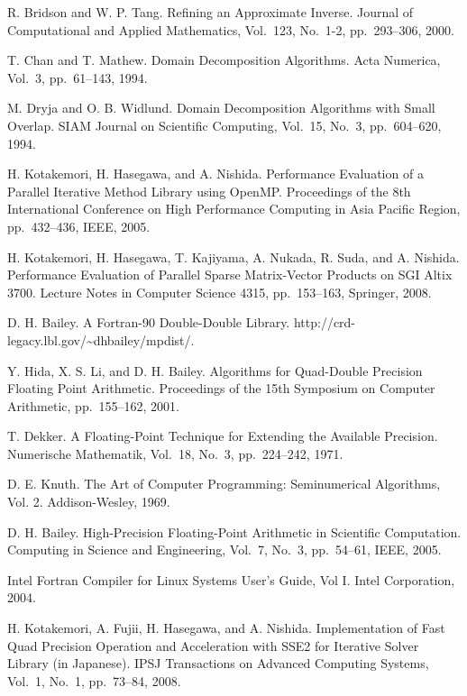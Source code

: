\documentclass[a4paper]{article}
\begin{document}
\begin{thebibliography}{10}
R. Bridson and W. P. Tang.
\newblock Refining an Approximate Inverse.
\newblock Journal of Computational and Applied Mathematics, Vol.~123, No.~1-2, pp.\ 293--306, 2000. 

T. Chan and T. Mathew.
\newblock Domain Decomposition Algorithms.
\newblock Acta Numerica, Vol.~3, pp.\ 61--143, 1994. 

M. Dryja and O. B. Widlund.
\newblock Domain Decomposition Algorithms with Small Overlap.
\newblock SIAM Journal on Scientific Computing, Vol.~15, No.~3, pp.\ 604--620, 1994.

H. Kotakemori, H. Hasegawa, and A. Nishida.
\newblock Performance Evaluation of a Parallel Iterative Method Library using OpenMP.
\newblock Proceedings of the 8th International Conference on High
	Performance Computing in Asia Pacific Region, pp.\ 432--436, IEEE, 2005.

H. Kotakemori, H. Hasegawa, T. Kajiyama, A. Nukada, R. Suda, and A. Nishida.
\newblock Performance Evaluation of Parallel Sparse Matrix-Vector Products on SGI Altix 3700.
\newblock Lecture Notes in Computer Science 4315, pp.\ 153--163, Springer, 2008.

D. H. Bailey.
\newblock A Fortran-90 Double-Double Library.
\newblock http://crd-legacy.lbl.gov/\textasciitilde dhbailey/mpdist/.

Y. Hida, X. S. Li, and D. H. Bailey.
\newblock Algorithms for Quad-Double Precision Floating Point Arithmetic.
\newblock Proceedings of the 15th Symposium on Computer Arithmetic, pp.\ 155--162, 2001.

T. Dekker.
\newblock A Floating-Point Technique for Extending the Available Precision.
\newblock Numerische Mathematik, Vol.~18, No.~3, pp.\ 224--242, 1971.

D. E. Knuth.
The Art of Computer Programming: Seminumerical Algorithms, Vol. 2.
Addison-Wesley, 1969.

D. H. Bailey.
\newblock High-Precision Floating-Point Arithmetic in Scientific
	Computation.
\newblock Computing in Science and Engineering, Vol.~7, No.~3, pp.\ 54--61, IEEE, 2005.

\newblock Intel Fortran Compiler for Linux Systems User's Guide, Vol I.
\newblock Intel Corporation, 2004.

H. Kotakemori, A. Fujii, H. Hasegawa, and A. Nishida.
\newblock Implementation of Fast Quad Precision Operation and
	Acceleration with SSE2 for Iterative Solver Library (in
	Japanese).
\newblock IPSJ Transactions on Advanced Computing Systems,  Vol.~1, No.~1, pp.\ 73--84, 2008.


\end{thebibliography}
\end{document}
